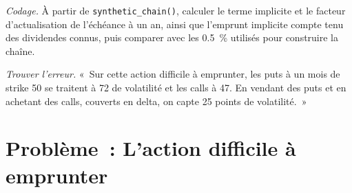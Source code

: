 \begin{exercise}[$\star\star\star$]\label{exo:dv:dividends-borrow-and-forwards:7}
\emph{Codage.} À partir de \texttt{synthetic\_chain()}, calculer le terme implicite et
le facteur d'actualisation de l'échéance à un an, ainsi que l'emprunt implicite compte tenu des dividendes connus,
puis comparer avec les 0.5~\% utilisés pour construire la chaîne.
\end{exercise}

\begin{exercise}[$\star\star\star$]\label{exo:dv:dividends-borrow-and-forwards:8}
\emph{Trouver l'erreur.} «~Sur cette action difficile à emprunter, les puts à un mois de strike 50 se traitent à 72
de volatilité et les calls à 47. En vendant des puts et en achetant des calls, couverts en delta, on capte 25
points de volatilité.~»
\end{exercise}

\section{Problème~: L'action difficile à emprunter}

